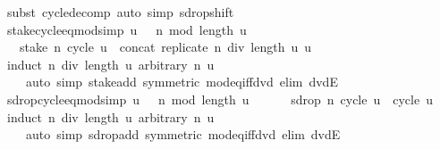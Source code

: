 \begin{isabellebody}
\endisadelimproof
%
\isatagproof
{}\isamarkupfalse%
\ {\isacharparenleft}subst\ cycle{\isacharunderscore}decomp{\isacharparenright}\ {\isacharparenleft}auto\ simp{\isacharcolon}\ sdrop{\isacharunderscore}shift{\isacharparenright}%
\endisatagproof
{\isafoldproof}%
%
\isadelimproof
\isanewline
%
\endisadelimproof
\isanewline
{}\isamarkupfalse%
\ stake{\isacharunderscore}cycle{\isacharunderscore}eq{\isacharunderscore}mod{\isacharunderscore}{}{\isacharbrackleft}simp{\isacharbrackright}{\isacharcolon}\ {\isachardoublequoteopen}{\isasymlbrakk}u\ {\isasymnoteq}\ {\isacharbrackleft}{\isacharbrackright}{\isacharsemicolon}\ n\ mod\ length\ u\ {\isacharequal}\ {}{\isasymrbrakk}\ {\isasymLongrightarrow}\isanewline
\ \ \ stake\ n\ {\isacharparenleft}cycle\ u{\isacharparenright}\ {\isacharequal}\ concat\ {\isacharparenleft}replicate\ {\isacharparenleft}n\ div\ length\ u{\isacharparenright}\ u{\isacharparenright}{\isachardoublequoteclose}\isanewline
%
\isadelimproof
\ \ %
\endisadelimproof
%
\isatagproof
{}\isamarkupfalse%
\ {\isacharparenleft}induct\ {\isachardoublequoteopen}n\ div\ length\ u{\isachardoublequoteclose}\ arbitrary{\isacharcolon}\ n\ u{\isacharparenright}\isanewline
\ \ \ \ {\isacharparenleft}auto\ simp{\isacharcolon}\ stake{\isacharunderscore}add\ {\isacharbrackleft}symmetric{\isacharbrackright}\ mod{\isacharunderscore}eq{\isacharunderscore}{}{\isacharunderscore}iff{\isacharunderscore}dvd\ elim{\isacharbang}{\isacharcolon}\ dvdE{\isacharparenright}%
\endisatagproof
{\isafoldproof}%
%
\isadelimproof
\isanewline
%
\endisadelimproof
\isanewline
{}\isamarkupfalse%
\ sdrop{\isacharunderscore}cycle{\isacharunderscore}eq{\isacharunderscore}mod{\isacharunderscore}{}{\isacharbrackleft}simp{\isacharbrackright}{\isacharcolon}\ {\isachardoublequoteopen}{\isasymlbrakk}u\ {\isasymnoteq}\ {\isacharbrackleft}{\isacharbrackright}{\isacharsemicolon}\ n\ mod\ length\ u\ {\isacharequal}\ {}{\isasymrbrakk}\ {\isasymLongrightarrow}\isanewline
\ \ \ sdrop\ n\ {\isacharparenleft}cycle\ u{\isacharparenright}\ {\isacharequal}\ cycle\ u{\isachardoublequoteclose}\isanewline
%
\isadelimproof
\ \ %
\endisadelimproof
%
\isatagproof
{}\isamarkupfalse%
\ {\isacharparenleft}induct\ {\isachardoublequoteopen}n\ div\ length\ u{\isachardoublequoteclose}\ arbitrary{\isacharcolon}\ n\ u{\isacharparenright}\isanewline
\ \ \ \ {\isacharparenleft}auto\ simp{\isacharcolon}\ sdrop{\isacharunderscore}add\ {\isacharbrackleft}symmetric{\isacharbrackright}\ mod{\isacharunderscore}eq{\isacharunderscore}{}{\isacharunderscore}iff{\isacharunderscore}dvd\ elim{\isacharbang}{\isacharcolon}\ dvdE{\isacharparenright}%

\end{isabellebody}
